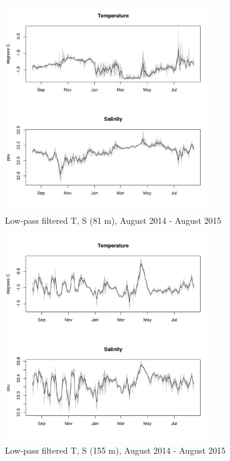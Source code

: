 \documentclass[12pt]{dforeport}
\begin{document}
\begin{figure}  
\centering
\includegraphics[width = 0.8\textwidth]{./figures/30_lpf_TS_81m_2014_2015.png}
\caption[Low-pass filtered T, S (81 m), 2014-2015]{Low-pass filtered T, S (81 m), August 2014 - August 2015}
\label{f:ctd_81_lpf_2014_2015}
\end{figure}

\begin{figure}  
\centering
\includegraphics[width = 0.8\textwidth]{./figures/31_lpf_TS_155m_2014_2015.png}
\caption[Low-pass filtered T, S (155 m), 2014-2015]{Low-pass filtered T, S (155 m), August 2014 - August 2015}
\label{f:ctd_155_lpf_2014_2015}
\end{figure}
\end{document}
